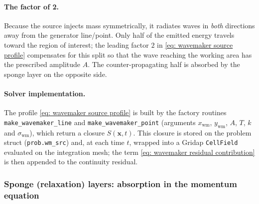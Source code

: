 \documentclass{article}
\begin{document}
\paragraph{The factor of 2.} Because the source injects mass symmetrically, it radiates waves in
\emph{both} directions away from the generator line/point. Only half of the emitted energy travels
toward the region of interest; the leading factor $2$ in \eqref{eq: wavemaker source profile}
compensates for this split so that the wave reaching the working area has the prescribed amplitude
$A$. The counter-propagating half is absorbed by the sponge layer on the opposite side.

\paragraph{Solver implementation.} The profile \eqref{eq: wavemaker source profile} is built by the
factory routines \texttt{make\_wavemaker\_line} and \texttt{make\_wavemaker\_point} (arguments
$x_{\text{wm}}$, $y_{\text{wm}}$, $A$, $T$, $k$ and $\sigma_{\text{wm}}$), which return a
closure $S(\mathbf{x},t)$. This closure is stored on the problem struct (\texttt{prob.wm\_src}) and,
at each time $t$, wrapped into a Gridap \texttt{CellField} evaluated on the integration mesh; the term
\eqref{eq: wavemaker residual contribution} is then appended to the continuity residual.

\subsubsection*{Sponge (relaxation) layers: absorption in the momentum equation}
\end{document}
